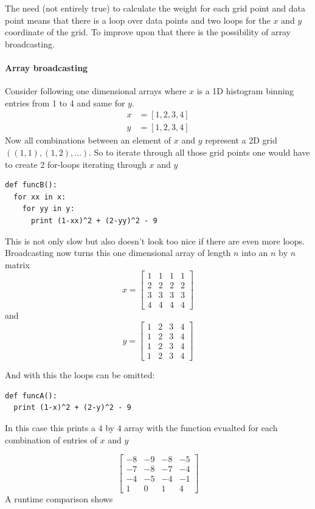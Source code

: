 \documentclass[10pt,twoside]{scrreprt}
\begin{document}
The need (not entirely true) to calculate the weight for each grid point and data point means that there is a loop over data points and two loops for the $x$ and $y$ coordinate of the grid. To improve upon that there is the possibility of array broadcasting.

\paragraph{Array broadcasting}
Consider following one dimensional arrays where $x$ is a 1D histogram binning entries from 1 to 4 and same for $y$. 
\begin{align*}
  x &= [1, 2, 3, 4]\\
  y &= [1, 2, 3, 4]  
\end{align*}
Now all combinations between an element of $x$ and $y$ represent a 2D grid $\left((1,1), (1,2), ...\right)$. So to iterate through all those grid points one would have to create 2 for-loops iterating through $x$ and $y$

\begin{lstlisting}
def funcB():
  for xx in x:
    for yy in y:
      print (1-xx)^2 + (2-yy)^2 - 9
\end{lstlisting}
This is not only slow but also doesn't look too nice if there are even more loops.
Broadcasting now turns this one dimensional array of length $n$ into an $n\text{ by }n$ matrix
\[
  x = \begin{bmatrix}
  1 & 1 & 1 & 1 \\
  2 & 2 & 2 & 2 \\
  3 & 3 & 3 & 3\\
  4 & 4 & 4 & 4
  \end{bmatrix}
\]
and
\[
  y = \begin{bmatrix}
  1 & 2 & 3 & 4 \\
  1 & 2 & 3 & 4 \\
  1 & 2 & 3 & 4 \\
  1 & 2 & 3 & 4 
\end{bmatrix}
\]

And with this the loops can be omitted:
\begin{lstlisting}
def funcA():
  print (1-x)^2 + (2-y)^2 - 9
\end{lstlisting}
In this case this prints a $4$ by $4$ array with the function evualted for each combination of entries of $x$ and $y$

\[
  \begin{bmatrix}
    -8& -9& -8& -5\\
    -7& -8& -7& -4\\
    -4& -5& -4& -1\\
     1&  0&  1&  4
       \end{bmatrix}
\]
A runtime comparison shows 
\end{document}
